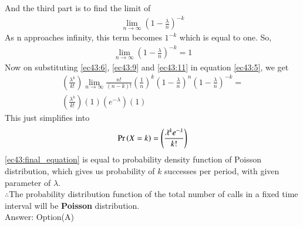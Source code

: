 And the third part is to find the limit of 
\begin{align}
    \lim_{n \to \infty}\left(1-\frac{\lambda}{n}\right)^{-k}
\end{align}
As n approaches infinity, this term becomes $1^{-k}$ which is equal to one.
So,
\begin{align}\label{ec43:11}
    \lim_{n \to \infty}\left(1-\frac{\lambda}{n}\right)^{-k}=1
\end{align}
Now on substituting \eqref{ec43:6}, \eqref{ec43:9} and \eqref{ec43:11} in equation \eqref{ec43:5}, we get
\begin{multline}  
    \left(\frac{\lambda^k}{k!}\right)\lim_{n \to \infty}\frac{n!}{(n-k)!}\left(\frac{1}{n}\right)^k\left(1-\frac{\lambda}{n}\right)^n\left(1-\frac{\lambda}{n}\right)^{-k}=\\
    \left(\frac{\lambda^k}{k!}\right)(1)\left(e^{-\lambda}\right)(1)
\end{multline}
This just simplifies into
\begin{align}\label{ec43:final_equation}
    \pr{X=k}=\left(\frac{\lambda^k e^{-\lambda}}{k!}\right)
\end{align}
   \eqref{ec43:final_equation} is equal to probability density function of Poisson distribution, which gives us probability of $k$ successes per period, with given parameter of $\lambda$.\\
   
   $\therefore $The probability distribution function of the total
number of calls in a fixed time interval will be \textbf{Poisson} distribution.\\
Answer: Option(A)

